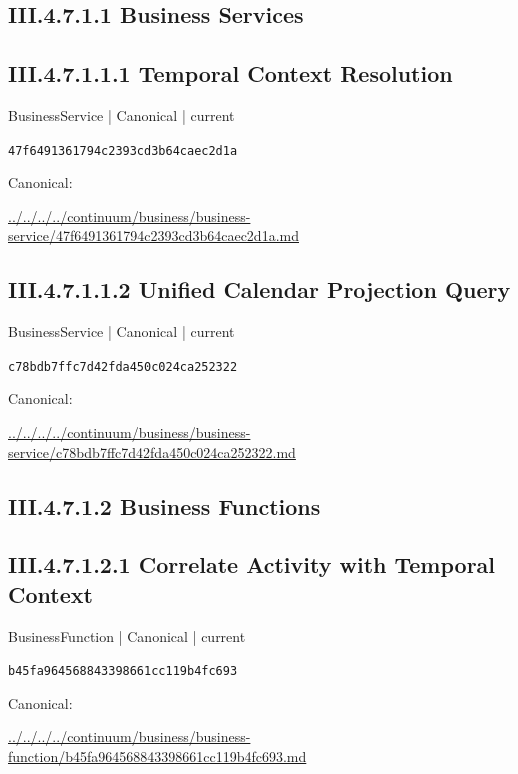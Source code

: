 \documentclass[10pt,a4paper]{article}
\begin{document}
\subsection*{III.4.7.1.1 Business Services}
\subsection*{III.4.7.1.1.1 Temporal Context Resolution}
\label{element-47f6491361794c2393cd3b64caec2d1a}
{\small BusinessService | Canonical | current}\par
\texttt{47f6491361794c2393cd3b64caec2d1a}\par
Canonical: \par
{\footnotesize\url{../../../../continuum/business/business-service/47f6491361794c2393cd3b64caec2d1a.md}}\par
\subsection*{III.4.7.1.1.2 Unified Calendar Projection Query}
\label{element-c78bdb7ffc7d42fda450c024ca252322}
{\small BusinessService | Canonical | current}\par
\texttt{c78bdb7ffc7d42fda450c024ca252322}\par
Canonical: \par
{\footnotesize\url{../../../../continuum/business/business-service/c78bdb7ffc7d42fda450c024ca252322.md}}\par
\subsection*{III.4.7.1.2 Business Functions}
\subsection*{III.4.7.1.2.1 Correlate Activity with Temporal Context}
\label{element-b45fa964568843398661cc119b4fc693}
{\small BusinessFunction | Canonical | current}\par
\texttt{b45fa964568843398661cc119b4fc693}\par
Canonical: \par
{\footnotesize\url{../../../../continuum/business/business-function/b45fa964568843398661cc119b4fc693.md}}\par
\end{document}

